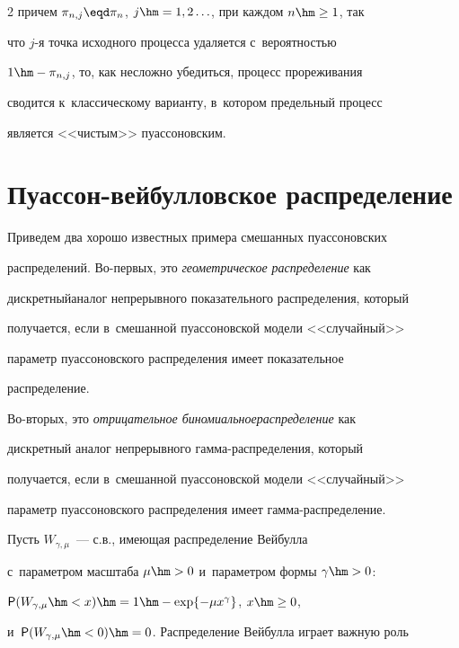 \begin{multicols}{2}
причем $\pi_{n,j}\eqd\pi_n$, $j\hm=1,2\ldots$, при каждом $n\hm\ge1$, так


что $j$-я точка исходного процесса удаляется с~ве\-ро\-ят\-ностью


$1\hm-\pi_{n,j}$, то, как несложно убедиться, процесс прореживания


сводится к~классическому варианту, в~котором предельный процесс


является <<чистым>> пуассоновским.





\section{Пуассон-вейбулловское распределение}





Приведем два хорошо известных примера смешанных пуассоновских


распределений. Во-пер\-вых, это \textit{геометрическое распределение} как


дискретный\linebreak аналог непрерывного показательного распределения, который


получается, если в~смешанной пу\-ассоновской модели <<случайный>>


параметр пу\-ас\-соновского распределения имеет показательное


распреде\-ление.





Во-вторых, это \textit{отрицательное биномиальное\linebreak распределение} как


дискретный аналог непрерывного гам\-ма-рас\-пре\-де\-ле\-ния, который


получается, если в~смешанной пуассоновской модели <<случайный>>


параметр пуассоновского распределения имеет гам\-ма-рас\-пре\-де\-ле\-ние.





Пусть $W_{\gamma, \mu}$~--- с.в., имеющая распределение Вейбулла 


с~параметром масштаба $\mu\hm>0$ и~параметром формы $\gamma\hm>0$: 


${\sf P}(W_{\gamma,\mu}\hm<x)\hm=1\hm-\exp\{-\mu x^{\gamma}\}$, $x\hm\ge0$, 


и~${\sf P}(W_{\gamma,\mu}\hm<0)\hm=0$. Распределение Вейбулла играет важную роль



\end{multicols}
